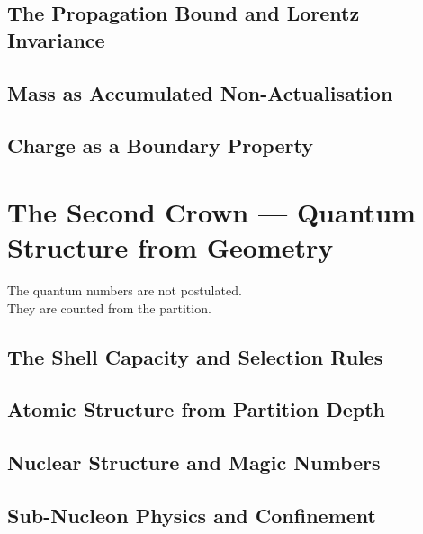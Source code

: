 \documentclass[12pt, twoside, openright]{book}
\theoremstyle{definition}
\theoremstyle{remark}
\begin{document}
\chapter{The Propagation Bound and Lorentz Invariance}
\label{ch:lorentz}


\chapter{Mass as Accumulated Non-Actualisation}
\label{ch:mass}


\chapter{Charge as a Boundary Property}
\label{ch:charge}


\part{The Second Crown --- Quantum Structure from Geometry}
\label{part:quantum}

\epigraph{%
  The quantum numbers are not postulated.\\
  They are counted from the partition.%
}{}

\chapter{The Shell Capacity and Selection Rules}
\label{ch:shells}


\chapter{Atomic Structure from Partition Depth}
\label{ch:atomic}


\chapter{Nuclear Structure and Magic Numbers}
\label{ch:nuclear}


\chapter{Sub-Nucleon Physics and Confinement}
\label{ch:subnucleon}

\end{document}
